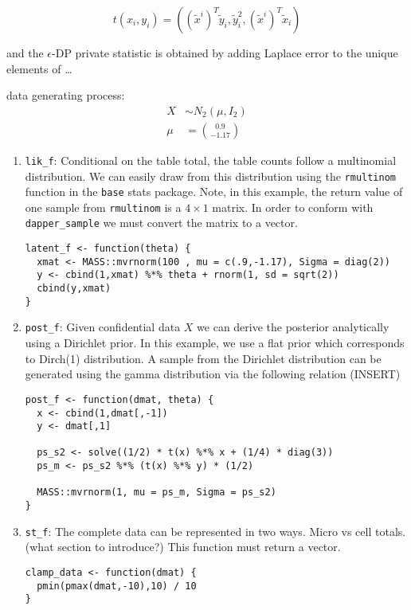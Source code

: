 \[
t(x_i,y_i) = ((\tilde{x}^{i})^T \tilde{y}_i, \tilde{y}_i^2, (\tilde{x}^{i})^T \tilde{x}_i)
\]

and the \(\epsilon\)-DP private statistic is obtained by adding Laplace error
to the unique elements of \ldots{}

data generating process:
\[
\begin{split}
X &\sim N_{2}(\mu, I_2)\\
\mu &= \binom{0.9}{-1.17}
\end{split}
\]

\begin{enumerate}
\def\labelenumi{\arabic{enumi}.}
\item
  \texttt{lik\_f}: Conditional on the table total, the table counts follow a multinomial
  distribution. We can easily draw from this distribution using the
  \texttt{rmultinom} function in the \texttt{base} stats package. Note, in this example,
  the return value of one sample from \texttt{rmultinom} is a \(4 \times 1\) matrix. In order to
  conform with \texttt{dapper\_sample} we must convert the matrix to a vector.

\begin{verbatim}
latent_f <- function(theta) {
  xmat <- MASS::mvrnorm(100 , mu = c(.9,-1.17), Sigma = diag(2))
  y <- cbind(1,xmat) %*% theta + rnorm(1, sd = sqrt(2))
  cbind(y,xmat)
}
\end{verbatim}
\item
  \texttt{post\_f}: Given confidential data \(X\) we can derive the posterior analytically
  using a Dirichlet prior. In this example, we use a flat prior which
  corresponds to Dirch(1) distribution. A sample from the Dirichlet distribution
  can be generated using the gamma distribution via the following relation (INSERT)

\begin{verbatim}
post_f <- function(dmat, theta) {
  x <- cbind(1,dmat[,-1])
  y <- dmat[,1]

  ps_s2 <- solve((1/2) * t(x) %*% x + (1/4) * diag(3))
  ps_m <- ps_s2 %*% (t(x) %*% y) * (1/2)

  MASS::mvrnorm(1, mu = ps_m, Sigma = ps_s2)
}
\end{verbatim}
\item
  \texttt{st\_f}: The complete data can be represented in two ways. Micro vs cell totals.
  (what section to introduce?) This function must return a vector.

\begin{verbatim}
clamp_data <- function(dmat) {
  pmin(pmax(dmat,-10),10) / 10
}


\end{verbatim}
\end{enumerate}
